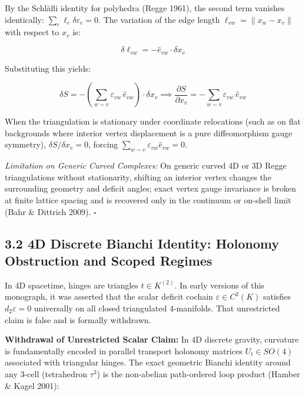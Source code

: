 \documentclass[11pt]{article}
\begin{document}
By the Schläfli identity for polyhedra (Regge 1961), the second term vanishes identically: $\sum_e \ell_e \delta \varepsilon_e = 0$. The variation of the edge length $\ell_{vw} = \|x_w - x_v\|$ with respect to $x_v$ is:

\begin{equation*}
\delta \ell_{vw} = -\hat{e}_{vw} \cdot \delta x_v
\end{equation*}

Substituting this yields:

\begin{equation*}
\delta S = -\left( \sum_{w \sim v} \varepsilon_{vw} \, \hat{e}_{vw} \right) \cdot \delta x_v \implies \frac{\partial S}{\partial x_v} = -\sum_{w \sim v} \varepsilon_{vw} \, \hat{e}_{vw}
\end{equation*}

When the triangulation is stationary under coordinate relocations (such as on flat backgrounds where interior vertex displacement is a pure diffeomorphism gauge symmetry), $\delta S / \delta x_v = 0$, forcing $\sum_{w \sim v} \varepsilon_{vw} \hat{e}_{vw} = 0$.

\emph{Limitation on Generic Curved Complexes:} On generic curved 4D or 3D Regge triangulations without stationarity, shifting an interior vertex changes the surrounding geometry and deficit angles; exact vertex gauge invariance is broken at finite lattice spacing and is recovered only in the continuum or on-shell limit (Bahr \& Dittrich 2009). $\square$

\subsection{\texorpdfstring{3.2 4D Discrete Bianchi Identity: Holonomy Obstruction and Scoped Regimes}{3.2 4D Discrete Bianchi Identity: Holonomy Obstruction and Scoped Regimes}}

In 4D spacetime, hinges are triangles $t \in K^{(2)}$. In early versions of this monograph, it was asserted that the scalar deficit cochain $\varepsilon \in C^2(K)$ satisfies $d_2 \varepsilon = 0$ universally on all closed triangulated 4-manifolds. That unrestricted claim is false and is formally withdrawn.

\textbf{Withdrawal of Unrestricted Scalar Claim:} In 4D discrete gravity, curvature is fundamentally encoded in parallel transport holonomy matrices $U_t \in SO(4)$ associated with triangular hinges. The exact geometric Bianchi identity around any 3-cell (tetrahedron $\tau^3$) is the non-abelian path-ordered loop product (Hamber \& Kagel 2001):
\end{document}
